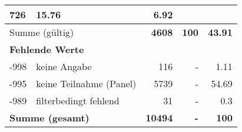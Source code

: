 \begin{longtable}{lXrrr}
       \num{726} &
       \num[round-mode=places,round-precision=2]{15.76} &
         \num[round-mode=places,round-precision=2]{6.92} \\
     \midrule
     \multicolumn{2}{l}{Summe (gültig)} &
       \textbf{\num{4608}} &
     \textbf{\num{100}} &
       \textbf{\num[round-mode=places,round-precision=2]{43.91}} \\
     \multicolumn{5}{l}{\textbf{Fehlende Werte}}\\
       -998 &
       keine Angabe &
         \num{116} &
        - &
         \num[round-mode=places,round-precision=2]{1.11} \\
       -995 &
       keine Teilnahme (Panel) &
         \num{5739} &
        - &
         \num[round-mode=places,round-precision=2]{54.69} \\
       -989 &
       filterbedingt fehlend &
         \num{31} &
        - &
         \num[round-mode=places,round-precision=2]{0.3} \\
     \midrule
     \multicolumn{2}{l}{\textbf{Summe (gesamt)}} &
          \textbf{\num{10494}} &
        \textbf{-} &
        \textbf{\num{100}} \\
     \bottomrule
     \end{longtable}
     
